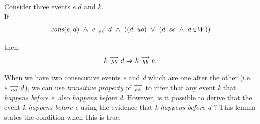 
\begin{lemma} 
    \label{Lemma1}
    Consider three events $e$,$d$ and $k$. \\

    If
        \[
            \cons{e}{d} \ \wedge \ \reln{e}{ao}{d} \ \wedge \
            (
                (\et{d}{uo}) \ \vee \
                (\et{d}{sc} \ \wedge \ \event{d}{W})
            )
        \]
        
    then,
        \[
            k\stackrel{\longrightarrow}{_{hb}}d \Rightarrow k\stackrel{\longrightarrow}{_{hb}}e.
        \]
      
    When we have two consecutive events \textit{e} and \textit{d} which are one after the other (i.e. $e\stackrel{\longrightarrow}{_{ao}}d$), we can use \textit{transitive property} of $\stackrel{\longrightarrow}{_{hb}}$ to infer that any event \textit{k} that \textit{happens before} \textit{e}, also \textit{happens before} \textit{d}. However, is it possible to derive that the event \textit{k happens before e} using the evidence that \textit{k happens before d} ? This lemma states the condition when this is true.
    
\end{lemma}

